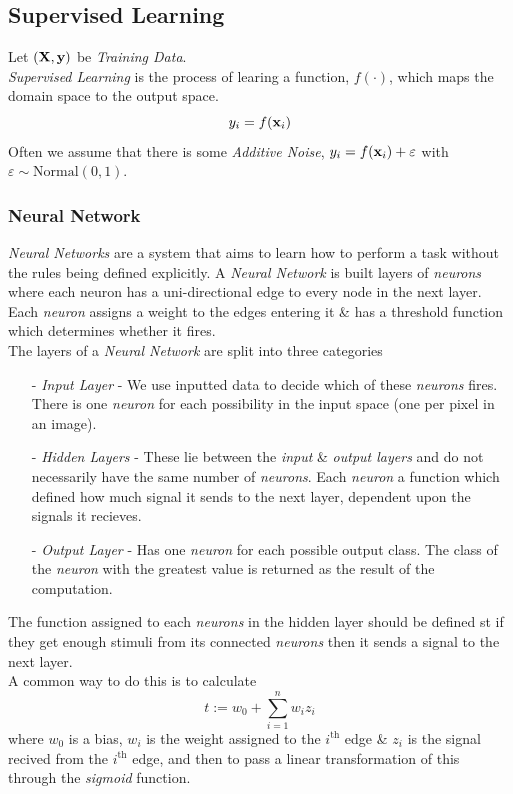 \documentclass[11pt,a4paper]{article}
\begin{document}
\subsection{Supervised Learning}

Let $(\textbf{X},\textbf{y})$ be \textit{Training Data}.\\
\textit{Supervised Learning} is the process of learing a function, $f(\cdot)$, which maps the domain space to the output space.
$$y_i=f(\textbf{x}_i)$$
\nb Often we assume that there is some \textit{Additive Noise}, $y_i=f(\textbf{x}_i)+\varepsilon$ with $\varepsilon\sim\text{Normal}(0,1)$.

\subsubsection{Neural Network}

\textit{Neural Networks} are a system that aims to learn how to perform a task without the rules being defined explicitly. A \textit{Neural Network} is built layers of \textit{neurons} where each neuron has a uni-directional edge to every node in the next layer. Each \textit{neuron} assigns a weight to the edges entering it \& has a threshold function which determines whether it fires.\\

The layers of a \textit{Neural Network} are split into three categories
\begin{itemize}
	\item[-] \textit{Input Layer} - We use inputted data to decide which of these \textit{neurons} fires. There is one \textit{neuron} for each possibility in the input space (\eg one per pixel in an image).
	\item[-] \textit{Hidden Layers} - These lie between the \textit{input} \& \textit{output layers} and do not necessarily have the same number of \textit{neurons}. Each \textit{neuron} a function which defined how much signal it sends to the next layer, dependent upon the signals it recieves.
	\item[-] \textit{Output Layer} - Has one \textit{neuron} for each possible output class. The class of the \textit{neuron} with the greatest value is returned as the result of the computation.
\end{itemize}

The function assigned to each \textit{neurons} in the hidden layer should be defined st if they get enough stimuli from its connected \textit{neurons} then it sends a signal to the next layer.\\
A common way to do this is to calculate
$$t:=w_0+\sum_{i=1}^nw_iz_i$$
where $w_0$ is a bias, $w_i$ is the weight assigned to the $i^\text{th}$ edge \& $z_i$ is the signal recived from the $i^\text{th}$ edge, and then to pass a linear transformation of this through the \textit{sigmoid} function.\\
\end{document}
